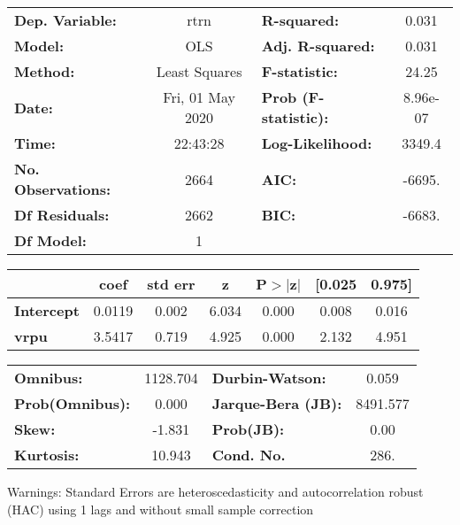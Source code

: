 \begin{center}
\begin{tabular}{lclc}
\toprule
\textbf{Dep. Variable:}    &       rtrn       & \textbf{  R-squared:         } &     0.031   \\
\textbf{Model:}            &       OLS        & \textbf{  Adj. R-squared:    } &     0.031   \\
\textbf{Method:}           &  Least Squares   & \textbf{  F-statistic:       } &     24.25   \\
\textbf{Date:}             & Fri, 01 May 2020 & \textbf{  Prob (F-statistic):} &  8.96e-07   \\
\textbf{Time:}             &     22:43:28     & \textbf{  Log-Likelihood:    } &    3349.4   \\
\textbf{No. Observations:} &        2664      & \textbf{  AIC:               } &    -6695.   \\
\textbf{Df Residuals:}     &        2662      & \textbf{  BIC:               } &    -6683.   \\
\textbf{Df Model:}         &           1      & \textbf{                     } &             \\
\bottomrule
\end{tabular}
\begin{tabular}{lcccccc}
                   & \textbf{coef} & \textbf{std err} & \textbf{z} & \textbf{P$> |$z$|$} & \textbf{[0.025} & \textbf{0.975]}  \\
\midrule
\textbf{Intercept} &       0.0119  &        0.002     &     6.034  &         0.000        &        0.008    &        0.016     \\
\textbf{vrpu}      &       3.5417  &        0.719     &     4.925  &         0.000        &        2.132    &        4.951     \\
\bottomrule
\end{tabular}
\begin{tabular}{lclc}
\textbf{Omnibus:}       & 1128.704 & \textbf{  Durbin-Watson:     } &    0.059  \\
\textbf{Prob(Omnibus):} &   0.000  & \textbf{  Jarque-Bera (JB):  } & 8491.577  \\
\textbf{Skew:}          &  -1.831  & \textbf{  Prob(JB):          } &     0.00  \\
\textbf{Kurtosis:}      &  10.943  & \textbf{  Cond. No.          } &     286.  \\
\bottomrule
\end{tabular}
\end{center}

Warnings: \newline
 [1] Standard Errors are heteroscedasticity and autocorrelation robust (HAC) using 1 lags and without small sample correction